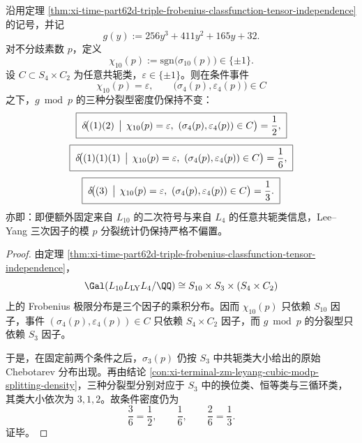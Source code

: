 \begin{theorem}\label{thm:xi-time-part62d-chi10-l4-conditioned-leyang-splitting-rigidity}
沿用定理 \ref{thm:xi-time-part62d-triple-frobenius-classfunction-tensor-independence} 的记号，并记
\[
g(y):=256y^3+411y^2+165y+32.
\]
对不分歧素数 \(p\)，定义
\[
\chi_{10}(p):=\mathrm{sgn}\!\bigl(\sigma_{10}(p)\bigr)\in\{\pm1\}.
\]
设 \(C\subset S_4\times C_2\) 为任意共轭类，\(\varepsilon\in\{\pm1\}\)。则在条件事件
\[
\chi_{10}(p)=\varepsilon,
\qquad
\bigl(\sigma_4(p),\varepsilon_4(p)\bigr)\in C
\]
之下，\(g\bmod p\) 的三种分裂型密度仍保持不变：
\[
\boxed{\;
\delta\!\bigl((1)(2)\,\bigm|\,\chi_{10}(p)=\varepsilon,\ (\sigma_4(p),\varepsilon_4(p))\in C\bigr)=\frac12,\;}
\]
\[
\boxed{\;
\delta\!\bigl((1)(1)(1)\,\bigm|\,\chi_{10}(p)=\varepsilon,\ (\sigma_4(p),\varepsilon_4(p))\in C\bigr)=\frac16,\;}
\]
\[
\boxed{\;
\delta\!\bigl((3)\,\bigm|\,\chi_{10}(p)=\varepsilon,\ (\sigma_4(p),\varepsilon_4(p))\in C\bigr)=\frac13.\;}
\]
亦即：即便额外固定来自 \(L_{10}\) 的二次符号与来自 \(L_4\) 的任意共轭类信息，Lee--Yang 三次因子的模 \(p\) 分裂统计仍保持严格不偏置。
\end{theorem}
\begin{proof}
由定理 \ref{thm:xi-time-part62d-triple-frobenius-classfunction-tensor-independence}，
\[
\Gal(L_{10}L_{\mathrm{LY}}L_4/\QQ)\cong S_{10}\times S_3\times (S_4\times C_2)
\]
上的 Frobenius 极限分布是三个因子的乘积分布。因而 \(\chi_{10}(p)\) 只依赖 \(S_{10}\) 因子，事件 \((\sigma_4(p),\varepsilon_4(p))\in C\) 只依赖 \(S_4\times C_2\) 因子，而 \(g\bmod p\) 的分裂型只依赖 \(S_3\) 因子。

于是，在固定前两个条件之后，\(\sigma_3(p)\) 仍按 \(S_3\) 中共轭类大小给出的原始 Chebotarev 分布出现。再由结论 \ref{con:xi-terminal-zm-leyang-cubic-modp-splitting-density}，三种分裂型分别对应于 \(S_3\) 中的换位类、恒等类与三循环类，其类大小依次为 \(3,1,2\)。故条件密度仍为
\[
\frac{3}{6}=\frac12,\qquad \frac{1}{6},\qquad \frac{2}{6}=\frac13.
\]
证毕。
\end{proof}

